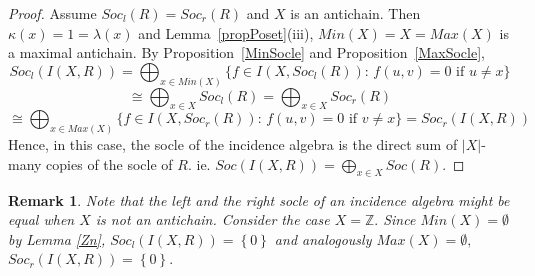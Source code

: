 \documentclass[12pt]{article}
\newtheorem{remark}[theorem]{Remark}
\begin{document}
\begin{proof}
Assume $Soc_l(R)=Soc_r(R)$ and $X$ is an antichain. Then $\kappa(x) = 1=
\lambda(x)$ and Lemma~\ref{propPoset}(iii), $Min(X) = X = Max(X)$ is a
maximal antichain. By Proposition~\ref{MinSocle} and Proposition~\ref{MaxSocle}, 
\begin{equation*}
Soc_l({I(X,R)}) =\bigoplus_{x \in Min(X)} \{f \in I(X,Soc_l(R)) : \, f(u,v)
= 0 \mbox{ if } u \neq x\} 
\end{equation*}
\begin{equation*}
\cong \bigoplus_{x \in X} Soc_l(R)
= \bigoplus_{x \in X} Soc_r(R) \end{equation*}
\begin{equation*}\cong \bigoplus_{x \in Max(X)} \{f \in
I(X,Soc_r(R)) : \, f(u,v) = 0 \mbox{ if } v \neq x\} = Soc_r({I(X,R)})
\end{equation*}
Hence, in this case, the socle of the incidence algebra is the direct sum of 
$|X|$-many copies of the socle of $R$. ie. $Soc({I(X,R)}) = \bigoplus_{x \in
X} Soc(R) $.
\end{proof}



\begin{remark}
\bigskip Note that the left and the right socle of an incidence algebra might be equal when $X$ is not an antichain. 
Consider the case $X=\mathbb{Z}.$ 
Since $Min(X)=\emptyset $ by Lemma \ref{Zn}, $Soc_{l}(I(X,R))=\left\{
0\right\} $ and analogously $Max(X)=\emptyset ,$ $Soc_{r}(I(X,R))=\left\{
0\right\}.$
\end{remark}
\end{document}
